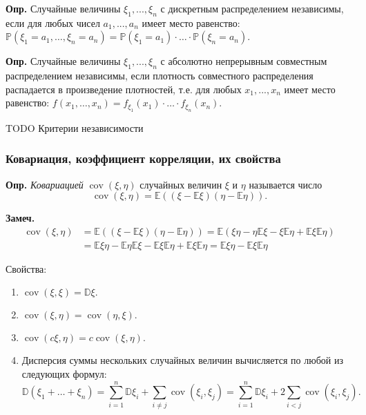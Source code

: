 \documentclass[oneside,final,14pt]{extreport}
\newcommand\mydef{{\bf Опр.}}
\newcommand\mynote{{\bf Замеч.}}
\theoremstyle{definition}
\begin{document}
\mydef{} Случайные величины $\xi_1, ..., \xi_n$ с дискретным распределением независимы, если для любых чисел $a_1, ..., a_n$ имеет место равенство: $\mathbb{P}\left(\xi_{1}=a_{1}, \ldots, \xi_{n}=a_{n}\right)=\mathbb{P}\left(\xi_{1}=a_{1}\right) \cdot \ldots \cdot \mathbb{P}\left(\xi_{n}=a_{n}\right)$.

\mydef{} Случайные величины $\xi_1, ..., \xi_n$ с абсолютно непрерывным совместным распределением независимы, если плотность совместного распределения распадается в произведение плотностей, т.е. для любых $x_1, ..., x_n$ имеет место равенство: $f\left(x_{1}, \ldots, x_{n}\right)=f_{\xi_{1}}\left(x_{1}\right) \cdot \ldots \cdot f_{\xi_{n}}\left(x_{n}\right)$.

TODO Критерии независимости

\subsubsection{Ковариация, коэффициент корреляции, их свойства}

\mydef{} {\it Ковариацией} $\operatorname{cov}(\xi,\eta)$ случайных величин $\xi$ и $\eta$ называется число $$\operatorname{cov}(\xi,\eta)=\mathbb{E}((\xi-\mathbb{E} \xi)(\eta-\mathbb{E} \eta)).$$

\mynote{} $$\begin{aligned} \operatorname{cov}(\xi, \eta) &=\mathbb{E}((\xi-\mathbb{E} \xi)(\eta-\mathbb{E} \eta))=\mathbb{E}(\xi \eta-\eta \mathbb{E} \xi-\xi \mathbb{E} \eta+\mathbb{E} \xi \mathbb{E} \eta) \\ &=\mathbb{E} \xi \eta-\mathbb{E} \eta \mathbb{E} \xi-\mathbb{E} \xi \mathbb{E} \eta+\mathbb{E} \xi \mathbb{E} \eta=\mathbb{E} \xi \eta-\mathbb{E} \xi \mathbb{E} \eta \end{aligned}$$

Свойства:

\begin{enumerate}
    \item $\operatorname{cov}(\xi, \xi)=\mathbb{D} \xi.$
    \item $\operatorname{cov}(\xi, \eta)=\operatorname{cov}(\eta, \xi).$
    \item $\operatorname{cov}(c \xi, \eta)=c \operatorname{cov}(\xi, \eta).$
    \item Дисперсия суммы нескольких случайных величин вычисляется по любой из следующих формул:
    $$\mathbb{D}\left(\xi_{1}+\ldots+\xi_{n}\right)=\sum_{i=1}^{n} \mathbb{D} \xi_{i}+\sum_{i \neq j} \operatorname{cov}\left(\xi_{i}, \xi_{j}\right)=\sum_{i=1}^{n} \mathbb{D} \xi_{i}+2 \sum_{i<j} \operatorname{cov}\left(\xi_{i}, \xi_{j}\right).$$
\end{enumerate}
\end{document}
